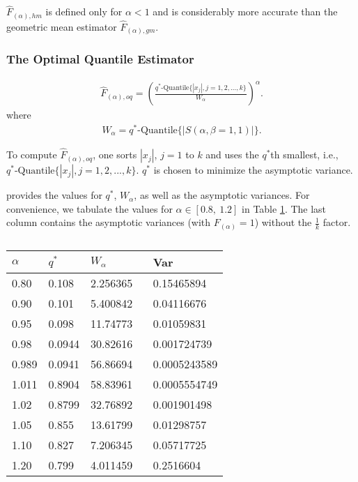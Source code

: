 \documentclass{sig-alternate}
\begin{document}
$\hat{F}_{(\alpha),hm}$ is defined only for $\alpha<1$ and is considerably more accurate than the geometric mean estimator $\hat{F}_{(\alpha),gm}$.

\subsubsection{The Optimal Quantile Estimator}

\begin{align}\label{eqn_F_oq}
\hat{F}_{(\alpha),oq} = \left(\frac{q^*\text{-Quantile}\{|x_j|, j = 1, 2, ..., k\}}{W_\alpha}\right)^\alpha.
\end{align}
where
\begin{align}
W_\alpha = q^*\text{-Quantile}\{|S(\alpha,\beta=1,1)|\}.
\end{align}

To compute $\hat{F}_{(\alpha),oq}$, one sorts $|x_j|$, $j =1$ to $k$ and uses the $q^*$th smallest, i.e., $q^*\text{-Quantile}\{|x_j|, j = 1, 2, ..., k\}$.  $q^*$ is chosen to minimize the asymptotic variance.

\cite{Report:Li_CC_oq} provides the values for $q^*$, $W_\alpha$, as well as the asymptotic variances. For convenience, we tabulate the values for $\alpha \in [0.8, \  1.2]$ in Table \ref{tab_oq}. The last column contains the asymptotic variances (with $F_{(\alpha)}=1$) without the $\frac{1}{k}$ factor.

\begin{table}[h]
\caption{\small
 }
\begin{center}{\scriptsize
\begin{tabular}{l l l l}
\hline \hline
$\alpha$ &$q^*$  &$W_\alpha$  &Var\\\hline
0.80 &0.108 &2.256365  &0.15465894  \\
0.90 &0.101 &5.400842 \  &0.04116676 \\
0.95 &0.098 &11.74773 &0.01059831    \\
0.98  & 0.0944 &30.82616 & 0.001724739  \\
0.989 & 0.0941 &56.86694 &0.0005243589 \\
1.011 & 0.8904 &58.83961  &0.0005554749 \\
1.02 & 0.8799 &32.76892  &0.001901498  \\
1.05 & 0.855 &13.61799   &0.01298757 \\
1.10 & 0.827 &7.206345   &0.05717725 \\
1.20 & 0.799 &4.011459   &0.2516604 \\
\hline\hline
\end{tabular}
}
\end{center}
\label{tab_oq}
\end{table}
\end{document}
